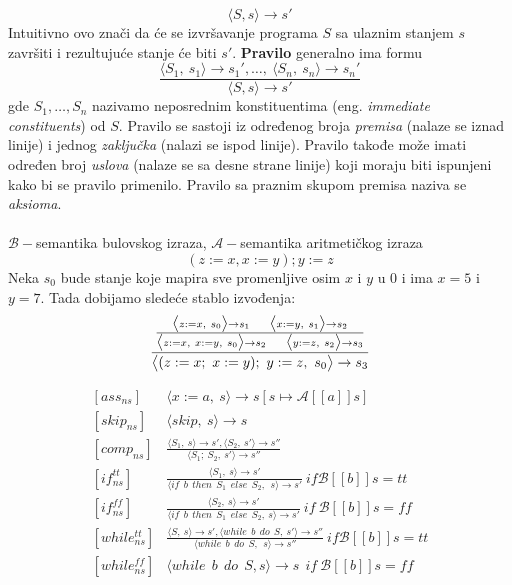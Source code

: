 \documentclass[../main.tex]{subfiles}
\begin{document}
\begin{boxprimer}[breakable]
\[ \big \langle S, s \big \rangle  \rightarrow s'\]
Intuitivno ovo znači da će se izvršavanje programa $S$ sa ulaznim stanjem $s$ završiti i rezultujuće stanje će biti $s'$. {\bf Pravilo} generalno ima formu
\[ \frac{ \big \langle S_1,\ s_1 \big \rangle \rightarrow s_1', \ldots,\ \big \langle S_n,\ s_n \big \rangle \rightarrow s_n' }{ \big \langle S, s \big \rangle \rightarrow s'} \]
gde $S_1, \ldots, S_n$ nazivamo neposrednim konstituentima (eng. {\it immediate constituents}) od $S$. Pravilo se sastoji iz određenog broja {\it premisa} (nalaze se iznad linije) i jednog {\it zaključka} (nalazi se ispod linije). Pravilo takođe može imati određen broj {\it uslova} (nalaze se sa desne strane linije) koji moraju biti ispunjeni kako bi se pravilo primenilo. Pravilo sa praznim skupom premisa naziva se {\it aksioma}.
\\
\\
$\mathcal{B}-$semantika bulovskog izraza, $\mathcal{A}-$semantika aritmetičkog izraza
\\
\[(z:=x, x:=y); y:=z\]
Neka $s_0$ bude stanje koje mapira sve promenljive osim $x$ i $y$ u 0 i ima $x=5$ i $y=7$. Tada dobijamo sledeće stablo izvođenja:
\[ \frac{\frac{
	 \big \langle z:=x,\ s_0 \big \rangle \rightarrow s_1  \hspace{5mm}  
	\big \langle x:=y,\ s_1 \big \rangle \rightarrow s_2} 
	{ \big \langle z:=x,\ x:=y,\ s_0 \big \rangle \rightarrow s_2  \hspace{5mm} 
	 \big \langle y:=z,\ s_2 \big \rangle \rightarrow s_3 }}
	{ \big \langle (z:=x;\ x:=y);\ y:=z,\ s_0 \big \rangle \rightarrow s_3} \]

\begin{align*}
&[ass_{ns}] &  
	\big \langle x := a,\ s\big \rangle  \rightarrow s[s\mapsto \mathcal{A}[[a]]s]& \\
&[skip_{ns}] &  
	\big \langle skip,\ s\big \rangle  \rightarrow s& \\
&[comp_{ns}] &  
	\frac{ \big \langle S_1,\ s\big \rangle \rightarrow s',  \big \langle S_2,\ s'\big \rangle \rightarrow s''}
	{ \big \langle S_1;\ S_2,\ s'\big \rangle \rightarrow s''}& \\
&[if_{ns}^{tt}] & 
	\frac{ \big \langle S_1,\ s\big \rangle \rightarrow s'}
	{ \big \langle if\ \ b\ \ then\ \ S_1\ \ else\ \ S_2,\ \ s\big \rangle \rightarrow s'}\ if \mathcal{B}[[b]]s=tt& \\
&[if_{ns}^{ff}] & 
	\frac{ \big \langle S_2,\ s\big \rangle \rightarrow s'}
	{ \big \langle if\ \ b\ \ then\ \ S_1\ \ else\ \ S_2,\ s\big \rangle \rightarrow s'}\ if \ \mathcal{B}[[b]]s=ff& \\
&[while_{ns}^{tt}] & 
	\frac{ \big \langle S,\  s\big \rangle \rightarrow s', \big \langle while\ \ b\ \ do\ \ S,\ s'\big \rangle \rightarrow s''}
	{ \big \langle while\ \ b\ \ do\ \ S,\ \ s \big \rangle \rightarrow s''}\ if \mathcal{B}[[b]]s=tt& \\
&[while_{ns}^{ff}] & \big \langle while\ \ b\ \ do\ \ S, s \big \rangle \rightarrow s\ \ if\ \mathcal{B}[[b]]s=ff& \\
\end{align*}


\end{boxprimer}
\end{document}
